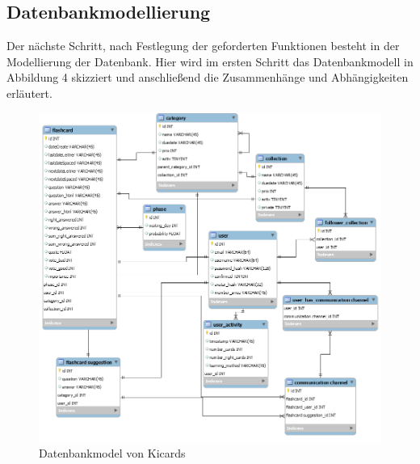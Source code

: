 \subsection{Datenbankmodellierung}
Der nächste Schritt, nach Festlegung der geforderten Funktionen besteht in der Modellierung der Datenbank. Hier wird im ersten Schritt das Datenbankmodell in Abbildung 4 skizziert und anschließend die Zusammenhänge und Abhängigkeiten erläutert.  \\

\begin{figure}[h]
 \includegraphics[width = 15cm]{databasemodel.png}
 \caption{Datenbankmodel von Kicards}
 \label{fig:datenbankmodel}
\end{figure}


